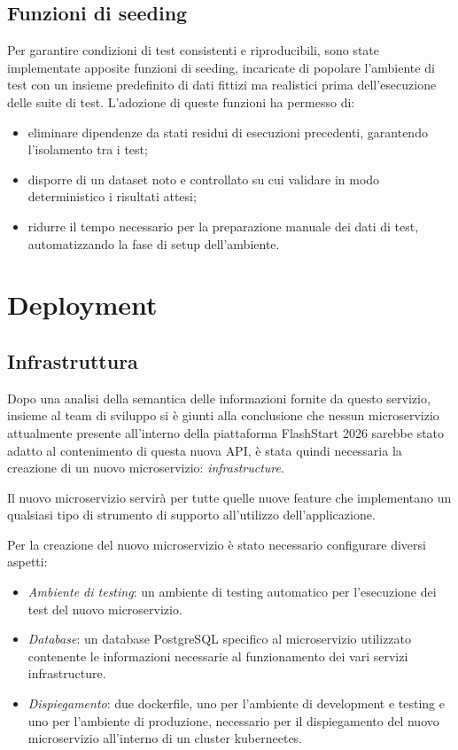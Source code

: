\subsection{Funzioni di seeding}
Per garantire condizioni di test consistenti e riproducibili, sono state implementate apposite funzioni di seeding, incaricate di popolare l'ambiente di test con un insieme predefinito di dati fittizi ma realistici prima dell'esecuzione delle suite di test. 
L'adozione di queste funzioni ha permesso di:
\begin{itemize}
    \item eliminare dipendenze da stati residui di esecuzioni precedenti, garantendo l'isolamento tra i test;
    \item disporre di un dataset noto e controllato su cui validare in modo deterministico i risultati attesi;
    \item ridurre il tempo necessario per la preparazione manuale dei dati di test, automatizzando la fase di setup dell'ambiente.
\end{itemize}
\section{Deployment}
\subsection{Infrastruttura}
Dopo una analisi della semantica delle informazioni fornite da questo servizio, insieme al team di sviluppo si è giunti alla conclusione che nessun microservizio attualmente presente all'interno della piattaforma FlashStart 2026 sarebbe stato adatto al contenimento di questa nuova \ac{API}, è stata quindi necessaria la creazione di un nuovo microservizio: \emph{infrastructure}.

Il nuovo microservizio servirà per tutte quelle nuove feature che implementano un qualsiasi tipo di strumento di supporto all'utilizzo dell'applicazione.

Per la creazione del nuovo microservizio è stato necessario configurare diversi aspetti:
\begin{itemize}
    \item \emph{Ambiente di testing}: un ambiente di testing automatico per l'esecuzione dei test del nuovo microservizio.
    \item \emph{Database}: un database PostgreSQL specifico al microservizio utilizzato contenente le informazioni necessarie al funzionamento dei vari servizi infrastructure.
    \item \emph{Dispiegamento}: due dockerfile, uno per l'ambiente di development e testing e uno per l'ambiente di produzione, necessario per il dispiegamento del nuovo microservizio all'interno di un cluster kuberneetes.
\end{itemize}

